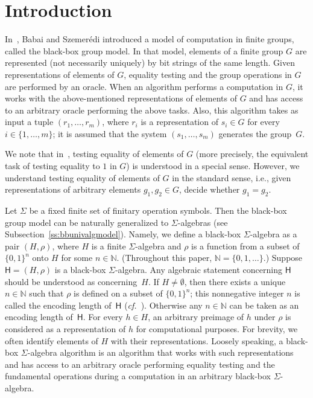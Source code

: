 \documentclass{jgcc}
\newcommand{\B}{\{0,1\}}
\newcommand{\bb}{\mathsf}
\newcommand{\N}{\mathbb N}
\newcommand{\cf}{\emph{cf.}}
\begin{document}
\section{Introduction}

In~\cite{BS84}, Babai and Szemer\'edi introduced a model of
computation in finite groups, called the black-box group
model. In that model, elements of a finite group $G$ are
represented (not necessarily uniquely) by bit strings of the
same length. Given representations of elements of $G$,
equality testing and the group operations in $G$ are
performed by an oracle. When an algorithm performs a
computation in $G$, it works with the above-mentioned
representations of elements of $G$ and has access to an
arbitrary oracle performing the above tasks. Also, this
algorithm takes as input a tuple $(r_1,\dots,r_m)$, where
$r_i$ is a representation of $s_i\in G$ for every
$i\in\{1,\dots,m\}$; it is assumed that the system
$(s_1,\dots,s_m)$ generates the group~$G$.

We note that in~\cite{BS84}, testing equality of elements of
$G$ (more precisely, the equivalent task of testing equality
to $1$ in $G$) is understood in a special sense. However, we
understand testing equality of elements of $G$ in the
standard sense, i.e., given representations of arbitrary
elements $g_1,g_2\in G$, decide whether $g_1=g_2$.

Let $\Sigma$ be a fixed finite set of finitary operation
symbols. Then the black-box group model can be naturally
generalized to $\Sigma$-algebras (see
Subsection~\ref{ss:bbunivalgmodel}). Namely, we define a
black-box $\Sigma$-algebra as a pair $(H,\rho)$, where $H$
is a finite $\Sigma$-algebra and $\rho$ is a function from a
subset of $\B^n$ onto $H$ for some $n\in\N$. (Throughout
this paper, $\N=\{0,1,\dotsc\}$.) Suppose $\bb H=(H,\rho)$
is a black-box $\Sigma$-algebra. Any algebraic statement
concerning $\bb H$ should be understood as concerning~$H$.
If $H\ne\emptyset$, then there exists a unique $n\in\N$ such
that $\rho$ is defined on a subset of $\B^n$; this
nonnegative integer $n$ is called the encoding length
of~$\bb H$ (\cf~\cite{BB99}). Otherwise any $n\in\N$ can be
taken as an encoding length of~$\bb H$. For every $h\in H$,
an arbitrary preimage of $h$ under $\rho$ is considered as a
representation of $h$ for computational purposes. For
brevity, we often identify elements of $H$ with their
representations. Loosely speaking, a black-box
$\Sigma$-algebra algorithm is an algorithm that works with
such representations and has access to an arbitrary oracle
performing equality testing and the fundamental operations
during a computation in an arbitrary black-box
$\Sigma$-algebra.
\end{document}
